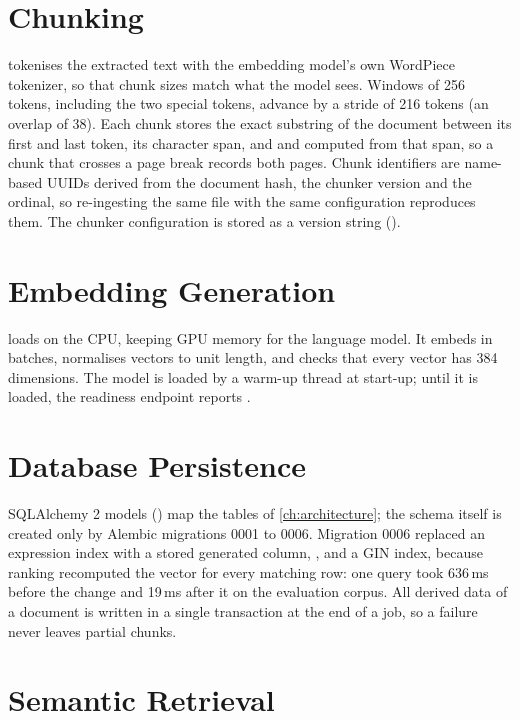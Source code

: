 \section{Chunking}

 tokenises the extracted text with the embedding model's own WordPiece tokenizer, so that chunk
sizes match what the model sees. Windows of 256 tokens, including the two special tokens, advance by a stride of 216
tokens (an overlap of 38). Each chunk stores the exact substring of the document between its first and last token,
its character span, and  and  computed from that span, so a chunk that crosses a
page break records both pages. Chunk identifiers are name-based UUIDs derived from the document hash, the chunker
version and the ordinal, so re-ingesting the same file with the same configuration reproduces them. The chunker
configuration is stored as a version string ().

\section{Embedding Generation}

 loads  on the CPU, keeping GPU memory for the language
model. It embeds in batches, normalises vectors to unit length, and checks that every vector has 384 dimensions.
The model is loaded by a warm-up thread at start-up; until it is loaded, the readiness endpoint reports
.

\section{Database Persistence}

SQLAlchemy 2 models () map the tables of \autoref{ch:architecture}; the schema itself
is created only by Alembic migrations 0001 to 0006. Migration 0006 replaced an expression index with a stored
generated column, , and a GIN index, because ranking recomputed
the vector for every matching row: one query took 636\,ms before the change and 19\,ms after it on the evaluation
corpus. All derived data of a document is written in a single transaction at the end of a job, so a failure never
leaves partial chunks.

\section{Semantic Retrieval}

